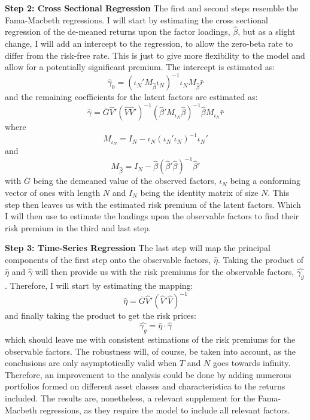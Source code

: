 \textbf{Step 2: Cross Sectional Regression} The first and second steps resemble the Fama-Macbeth regressions. I will start by estimating the cross sectional regression of the de-meaned returns upon the factor loadings, $\hat{\beta}$, but as a slight change, I will add an intercept to the regression, to allow the zero-beta rate to differ from the risk-free rate. This is just to give more flexibility to the model and allow for a potentially significant premium. The intercept is estimated as:
\begin{equation}
	\hat{\gamma}_{0}=\left(\iota_{N}'M_{\hat{\beta}}\iota_{N}\right)^{-1}\iota_{N}M_{\hat{\beta}}\bar{r}
\end{equation}
and the remaining coefficients for the latent factors are estimated as:
\begin{equation}
	\hat{\gamma}=\bar{G}\hat{V}'\left(\hat{V}\hat{V}'\right)^{-1}\left(\hat{\beta}'M_{\iota_{N}}\hat{\beta}\right)^{-1}\hat{\beta}M_{\iota_{N}}\bar{r}
\end{equation}
where
$$M_{\iota_{N}}=I_{N}-\iota_{N}\left(\iota_{N}'\iota_{N}\right)^{-1}\iota_{N}'$$
and
$$M_{\hat{\beta}}=I_{N}-\hat{\beta}\left(\hat{\beta}'\hat{\beta}\right)^{-1}\hat{\beta}'$$
with $\bar{G}$ being the demeaned value of the observed factors, $\iota_{N}$ being a conforming vector of ones with length $N$ and $I_{N}$ being the identity matrix of size $N$. This step then leaves us with the estimated risk premium of the latent factors. Which I will then use to estimate the loadings upon the observable factors to find their risk premium in the third and last step.

\textbf{Step 3: Time-Series Regression} The last step will map the principal components of the first step onto the observable factors, $\hat{\eta}$. Taking the product of $\hat{\eta}$ and $\hat{\gamma}$ will then provide us with the risk premiums for the observable factors, $\hat{\gamma_{g}}$. Therefore, I will start by estimating the mapping:
\begin{equation}
	\hat{\eta}=\bar{G}\hat{V}'\left(\hat{V}'\hat{V}\right)^{-1}
	\label{eq:tp_3_eta}
\end{equation}
and finally taking the product to get the risk prices:
\begin{equation}
	\hat{\gamma_{g}} = \hat{\eta}\cdot \hat{\gamma}
	\label{eq:tp_gammahat}
\end{equation}
which should leave me with consistent estimations of the risk premiums for the observable factors. The robustness will, of course, be taken into account, as the conclusions are only asymptotically valid when $T$ and $N$ goes towards infinity. Therefore, an improvement to the analysis could be done by adding numerous portfolios formed on different asset classes and characteristica to the returns included. The results are, nonetheless, a relevant supplement for the Fama-Macbeth regressions, as they require the model to include all relevant factors. 

